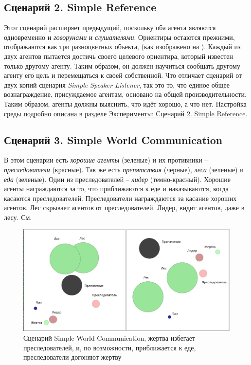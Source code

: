 \subsection{Сценарий 2. Simple Reference} \label{intro-sr}

Этот сценарий расширяет предыдущий, поскольку оба агента являются одновременно и \textit{говорунами} и \textit{слушателями}. Ориентиры остаются прежними, отображаются как три разноцветных объекта, (как изображено на ). Каждый из двух агентов пытается достичь своего целевого ориентира, который известен только другому агенту. Таким образом, он должен научиться сообщать другому агенту его цель и перемещаться к своей собственной. Что отличает сценарий от двух копий сценария \textit{Simple Speaker Listener}, так это то, что единое общее вознаграждение, присуждаемое агентам, основано на общей производительности. Таким образом, агенты должны выяснить, что идёт хорошо, а что нет. Настройка среды подробно описана в разделе \hyperref[exp-sr]{Эксперименты: Сценарий 2. Simple Reference}.

\subsection{Сценарий 3. Simple World Communication} \label{intro-swc}

В этом сценарии есть \textit{хорошие агенты} (зеленые) и их противники – \textit{преследователи} (красные). Так же есть \textit{препятствия} (черные), \textit{леса} (зеленые) и \textit{еда} (зеленые). Один из преследователей – \textit{лидер} (темно-красный).
Хорошие агенты награждаются за то, что приближаются к еде и наказываются, когда касаются преследователей.
Преследователи награждаются за касание хороших агентов.
Лес скрывает агентов от преследователей. Лидер, видит агентов, даже в лесу. См. 

\begin{figure}[ht!] 
	\center
	\includegraphics [scale=0.41] {my_folder/images/swc.png}
	\caption{Сценарий Simple World Communication, жертва избегает преследователей, и, по возможности, приближается к еде, преследователи догоняют жертву}
	\label{fig:swc}  
\end{figure}


